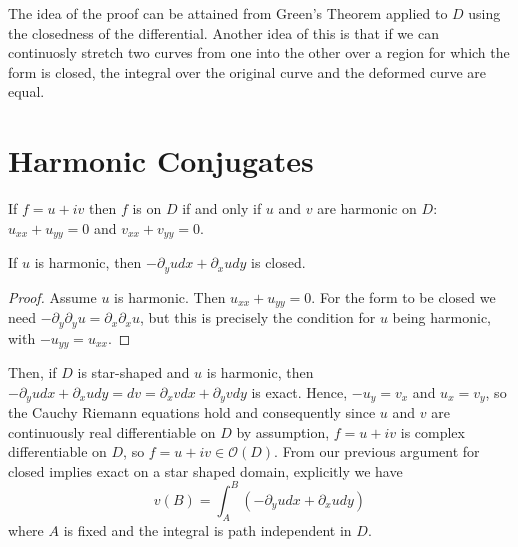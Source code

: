 The idea of the proof can be attained from Green's Theorem applied to $D$ using the closedness of the differential. Another idea of this is that if we can continuosly stretch two curves from one into the other over a region for which the form is closed, the integral over the original curve and the deformed curve are equal.


\section{Harmonic Conjugates}

\begin{remark}
    If $f= u+iv$ then $f$ is  on $D$ if and only if $u$ and $v$ are harmonic on $D$: $u_{xx}+u_{yy} = 0$ and $v_{xx}+v_{yy}=0$.
\end{remark}


\begin{lemma}
    If $u$ is harmonic, then $-\partial_yudx + \partial_xudy$ is closed.
\end{lemma}
\begin{proof}
    Assume $u$ is harmonic. Then $u_{xx}+u_{yy} = 0$. For the form to be closed we need $-\partial_y\partial_yu = \partial_x\partial_xu$, but this is precisely the condition for $u$ being harmonic, with $-u_{yy} = u_{xx}$.
\end{proof}

Then, if $D$ is star-shaped and $u$ is harmonic, then $-\partial_yudx+\partial_xudy = dv = \partial_xvdx+\partial_yvdy$ is exact. Hence, $-u_y = v_x$ and $u_x = v_y$, so the Cauchy Riemann equations hold and consequently since $u$ and $v$ are continuously real differentiable on $D$ by assumption, $f = u+iv$ is complex differentiable on $D$, so $f = u+iv \in \mathcal{O}(D)$. From our previous argument for closed implies exact on a star shaped domain, explicitly we have \begin{equation*}
    v(B) = \int_A^B(-\partial_yudx+\partial_xudy)
\end{equation*}
where $A$ is fixed and the integral is path independent in $D$.

